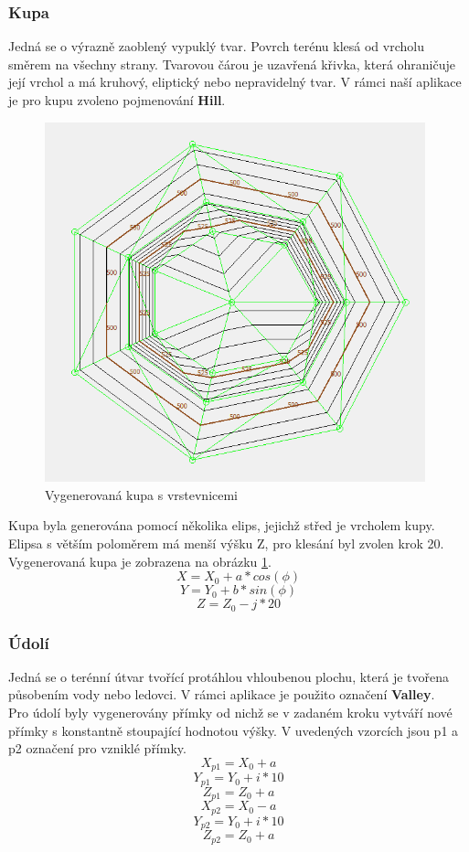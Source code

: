\documentclass[a4paper,11pt,twoside]{article}
\begin{document}
\subsubsection{Kupa}
Jedná se o výrazně zaoblený vypuklý tvar. Povrch terénu klesá od vrcholu směrem na všechny strany. Tvarovou čárou je uzavřená křivka, která ohraničuje její vrchol a má kruhový, eliptický nebo nepravidelný tvar. V rámci naší aplikace je pro kupu zvoleno pojmenování \textbf{Hill}.

\vspace{0.2cm}
\begin{figure}[hbt!] 
\begin{center}
\includegraphics[width=11cm]{pictures/kupa.PNG} 
\caption[Vygenerovaná kupa s vrstevnicemi]{Vygenerovaná kupa s vrstevnicemi}
\label{fig:kupa}
\end{center}
\end{figure}

\indent Kupa byla generována pomocí několika elips, jejichž střed je vrcholem kupy. Elipsa s větším poloměrem má menší výšku Z, pro klesání byl zvolen krok 20. Vygenerovaná kupa je zobrazena na obrázku \ref{fig:kupa}.
$$
X = X_0 + a * cos(\phi)
$$
$$
Y = Y_0 + b * sin(\phi)
$$
$$
Z = Z_0 - j* 20
$$



\subsubsection{Údolí}
Jedná se o terénní útvar tvořící protáhlou vhloubenou plochu, která je tvořena působením vody nebo ledovci. V rámci aplikace je použito označení \textbf{Valley}. \\
\indent Pro údolí byly vygenerovány přímky od nichž se v zadaném kroku vytváří nové přímky s konstantně stoupající hodnotou výšky. V uvedených vzorcích jsou p1 a p2 označení pro vzniklé přímky.\\
$$
X_{p1} = X_0 + a
$$
$$
Y_{p1} = Y_0 + i * 10
$$
$$
Z_{p1} = Z_0 + a
$$
$$
X_{p2} = X_0 - a
$$
$$
Y_{p2} = Y_0 + i * 10
$$
$$
Z_{p2} = Z_0 + a
$$
\end{document}
